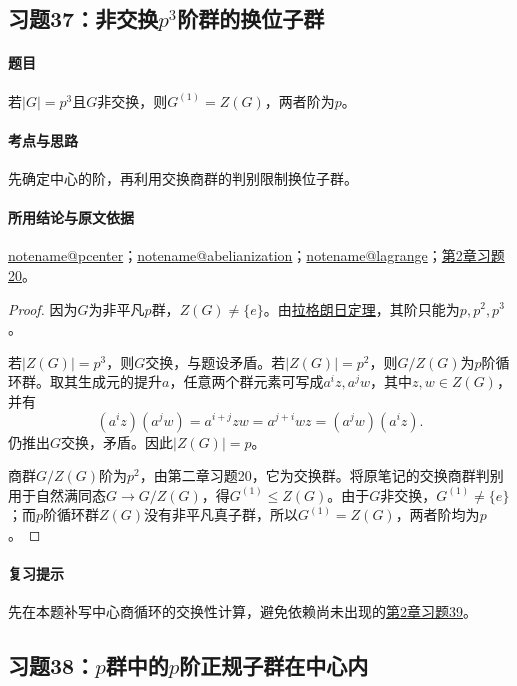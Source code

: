 \documentclass[UTF8,a4paper,11pt,fontset=windows]{ctexart}
\makeatletter
\newcommand{\noteref}[1]{\hyperref[note:#1]{\csname notename@#1\endcsname}}
\newcommand{\proofref}[2]{\hyperref[note:#1]{#2}}
\newcommand{\exref}[2]{\hyperref[ex:#1:#2]{第#1章习题#2}}
\makeatother
\begin{document}
\subsection{习题37：\texorpdfstring{非交换$p^3$阶群的换位子群}{非交换p3阶群的换位子群}}
\label{ex:2:37}

\paragraph{题目}
若$|G|=p^3$且$G$非交换，则$G^{(1)}=Z(G)$，两者阶为$p$。

\paragraph{考点与思路}
先确定中心的阶，再利用交换商群的判别限制换位子群。

\paragraph{所用结论与原文依据}
\noteref{pcenter}；\noteref{abelianization}；\noteref{lagrange}；\exref{2}{20}。


\begin{proof}
因为$G$为非平凡$p$群，$Z(G)\ne\{e\}$。由\proofref{lagrange}{拉格朗日定理}，其阶只能为$p,p^2,p^3$。

若$|Z(G)|=p^3$，则$G$交换，与题设矛盾。若$|Z(G)|=p^2$，则$G/Z(G)$为$p$阶循环群。取其生成元的提升$a$，任意两个群元素可写成$a^iz,a^jw$，其中$z,w\in Z(G)$，并有
\[
(a^iz)(a^jw)=a^{i+j}zw=a^{j+i}wz=(a^jw)(a^iz).
\]
仍推出$G$交换，矛盾。因此$|Z(G)|=p$。

商群$G/Z(G)$阶为$p^2$，由第二章习题20，它为交换群。将原笔记的交换商群判别用于自然满同态$G\to G/Z(G)$，得$G^{(1)}\leq Z(G)$。由于$G$非交换，$G^{(1)}\ne\{e\}$；而$p$阶循环群$Z(G)$没有非平凡真子群，所以$G^{(1)}=Z(G)$，两者阶均为$p$。
\end{proof}

\paragraph{复习提示}
先在本题补写中心商循环的交换性计算，避免依赖尚未出现的\exref{2}{39}。


\subsection{习题38：\texorpdfstring{$p$群中的$p$阶正规子群在中心内}{p群中的p阶正规子群在中心内}}
\label{ex:2:38}
\end{document}
